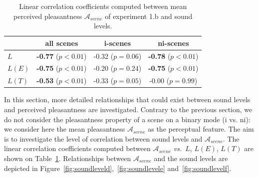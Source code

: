 \documentclass[12pt]{elsarticle}
\newcommand{\vs}{\emph{vs.}}
\begin{document}
\begin{table}[t]
\centering
\begin{tabular}{l c c c}
               & all scenes                & i-scenes          & ni-scenes    \\
\hline
$L$            & \textbf{-0.77} ($p<0.01$) & -0.32 ($p=0.06$)  & \textbf{-0.78} ($p<0.01$)\\
$L(E)$         & \textbf{-0.75} ($p<0.01$) & -0.20 ($p=0.24$)  & \textbf{-0.75} ($p<0.01$)\\
$L(T)$         & \textbf{-0.53} ($p<0.01$) & -0.33 ($p=0.05$)  &  -0.00 ($p=0.99$) \\
\hline
\end{tabular}
\vspace{0.5mm}
\caption{Linear correlation coefficients computed between mean perceived pleasantness $\mathcal{A}_{scene}$ of experiment 1.b and sound levels.}
\label{tab:corrStructA}
\end{table}


In this section, more detailed relationships that could exist between sound levels and perceived pleasantness are investigated. Contrary to the previous section, we do not consider the pleasantness property of a scene on a binary mode (i vs. ni): we consider here the mean pleasantness $\mathcal{A}_{scene}$ as the perceptual feature. The aim is to investigate the level of correlation between sound levels and $\mathcal{A}_{scene}$. The linear correlation coefficients computed between $\mathcal{A}_{scene}$ \vs~$L$, $L(E)$, $L(T)$ are shown on Table~\ref{tab:corrStructA}. Relationships between $\mathcal{A}_{scene}$ and the sound levels are depicted in Figure~\ref{fig:soundleveld},~\ref{fig:soundlevele} and~\ref{fig:soundlevelf}.
\end{document}
